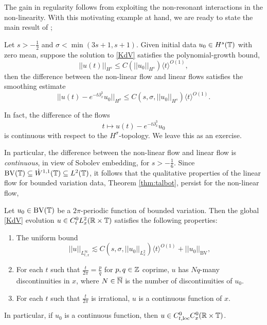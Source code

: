The gain in regularity follows from exploiting the non-resonant interactions in the non-linearity. With this motivating example at hand, we are ready to state the main result of \cite{ErdoganTzirakis2013};

\begin{theorem}
    Let $s > -\tfrac12$ and $\sigma < \min (3s + 1, s + 1)$. Given initial data $u_0 \in H^s (\mathbb T)$ with zero mean, suppose the solution to \eqref{KdV} satisfies the polynomial-growth bound,
        \begin{equation}
            ||u(t)||_{H^s}
                \leq C(||u_0||_{H^s}) \langle t \rangle^{O(1)},
        \end{equation}
    then the difference between the non-linear flow and linear flows satisfies the smoothing estimate 
        \begin{equation}
            ||u(t) - e^{-t \partial_x^3} u_0 ||_{H^\sigma}
                \leq C(s, \sigma, ||u_0||_{H^s})  \langle t \rangle^{O(1)}. 
        \end{equation}    
\end{theorem}

\begin{remark}
    In fact, the difference of the flows 
        \[
            t \mapsto u(t) - e^{-t \partial_x^3} u_0
        \]
    is continuous with respect to the $H^\sigma$-topology. We leave this as an exercise. 
\end{remark}

In particular, the difference between the non-linear flow and linear flow is \textit{continuous}, in view of Sobolev embedding, for $s > -\tfrac16$. Since $\mathrm{BV} (\mathbb T) \subseteq \dot W^{1, 1} (\mathbb T) \subseteq L^2 (\mathbb T)$, it follows that the qualitative properties of the linear flow for bounded variation data, Theorem \ref{thm:talbot}, persist for the non-linear flow,

\begin{corollary}
    Let $u_0 \in \mathrm{BV} (\mathbb T)$ be a $2\pi$-periodic function of bounded variation. Then the global \eqref{KdV} evolution $u \in C^0_t L^2_x (\mathbb R \times \mathbb T)$ satisfies the following properties: 
    \begin{enumerate}
        \item The uniform bound 
            \[
                ||u||_{L^\infty_{t, x}} 
                    \lesssim C(s, \sigma, ||u_0||_{L^2_x}) \langle t \rangle^{O(1)} + ||u_0||_{\mathrm{BV}},
            \]
        \item For each $t$ such that $\tfrac{t}{2\pi} = \tfrac{p}{q}$ for $p, q \in \mathbb Z$ coprime, $u$ has $Nq$-many discontinuities in $x$, where $N \in \overline {\mathbb N}$ is the number of discontinuities of $u_0$. 
        
        \item For each $t$ such that $\tfrac{t}{2\pi}$ is irrational, $u$ is a continuous function of $x$.
    \end{enumerate}
    In particular, if $u_0$ is a continuous function, then $u \in C^0_{t, \mathrm{loc}} C^0_x (\mathbb R \times \mathbb T)$. 
\end{corollary}


